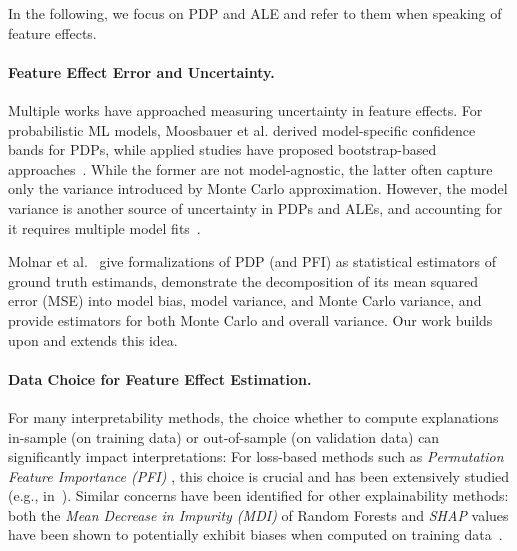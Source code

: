 \documentclass[runningheads]{llncs}
\begin{document}
In the following, we focus on PDP and ALE and refer to them when speaking of
feature effects.

\paragraph{Feature Effect Error and Uncertainty.}
Multiple works have approached measuring uncertainty in feature effects. For
probabilistic ML models, Moosbauer et al.\cite{moosbauer_explaining_2021}
derived model-specific confidence bands for PDPs, while applied studies have
proposed bootstrap-based
approaches~\cite{esselman_landscape_2015,grange_using_2019}. While the former
are not model-agnostic, the latter often capture only the variance introduced
by Monte Carlo approximation. However, the model variance is another source
of uncertainty in PDPs and ALEs, and accounting for it requires multiple model
fits~\cite{apley_visualizing_2020,molnar_general_2022}.

Molnar et al.~\cite{molnar_relating_2023} give formalizations of PDP (and PFI)
as statistical estimators of ground truth estimands, demonstrate the
decomposition of its mean squared error (MSE) into model bias, model variance,
and Monte Carlo variance, and provide estimators for both Monte Carlo and
overall variance. Our work builds upon and extends this idea.

\paragraph{Data Choice for Feature Effect Estimation.}
For many interpretability methods, the choice whether to compute explanations
in-sample (on training data) or out-of-sample (on validation data) can
significantly impact interpretations: For loss-based methods such as
\textit{Permutation Feature Importance (PFI)
}\cite{breiman_random_2001,fisher_all_2019}, this choice is crucial and has
been extensively studied (e.g., in~\cite{molnar_general_2022}). Similar
concerns have been identified for other explainability methods: both the
\textit{Mean Decrease in Impurity (MDI)} of Random Forests and \textit{SHAP}
values have been shown to potentially exhibit biases when computed on training
data~\cite{loecher_debiasing_2022,loecher_debiasing_2024}.
\end{document}

